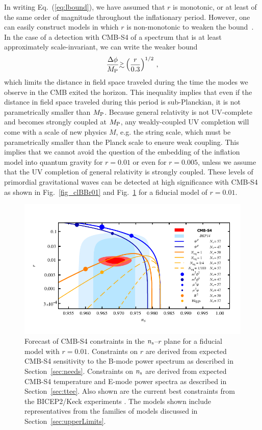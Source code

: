 In writing Eq.~(\ref{eq:lbound}), we have assumed that $r$ is monotonic, or at least of the same order of magnitude throughout the inflationary period. However, one can easily construct models in which $r$ is non-monotonic to weaken the bound~\cite{BenDayan:2009kv,Hotchkiss:2011gz, Chatterjee:2014hna}. In the case of a detection with CMB-S4 of a spectrum that is at least approximately scale-invariant, we can write the weaker bound
\begin{equation}
\frac{\Delta\phi}{M_{\rm P}}\gtrsim\left(\frac{r}{0.3}\right)^{1/2}\,,
\end{equation}
which limits the distance in field space traveled during the time the modes we observe in the CMB exited the horizon. This inequality implies that even if the distance in field space traveled during this period is sub-Planckian, it is not parametrically smaller than $M_{\rm P}$. Because general relativity is not UV-complete and becomes strongly coupled at $M_{\rm P}$, any weakly-coupled UV completion will come with a scale of new physics $M$, e.g. the string scale, which must be parametrically smaller than the Planck scale to ensure weak coupling. This implies that we cannot avoid the question of the embedding of the inflation model into quantum gravity for $r=0.01$ or even for $r=0.005$, unless we assume that the UV completion of general relativity is strongly coupled. These levels of primordial gravitational waves can be detected at high significance with CMB-S4 as shown in Fig.~\ref{fig_clBBr01} and Fig.~\ref{fig:nsrp01} for a fiducial model of $r=0.01$.

\begin{figure}[ht]
\centering
\includegraphics[width=6in]{Inflation/nsrlabeledrp01v3}
\caption{Forecast of CMB-S4 constraints in the $n_{\rm s}$--$r$ plane for a fiducial model with $r=0.01$. Constraints 
on $r$ are derived from expected CMB-S4 sensitivity to the B-mode power spectrum as described in 
Section~\ref{sec:needs}. Constraints on $n_{\rm s}$ are derived from expected CMB-S4 temperature and 
E-mode power spectra as described in Section~\ref{sec:ttee}. Also shown are the current best constraints
from the BICEP2/Keck experiments \cite{Ade:2015fwj}. The models shown include representatives from 
the families of models discussed in Section~\ref{sec:upperLimits}.
}
\label{fig:nsrp01}
\end{figure}
 

